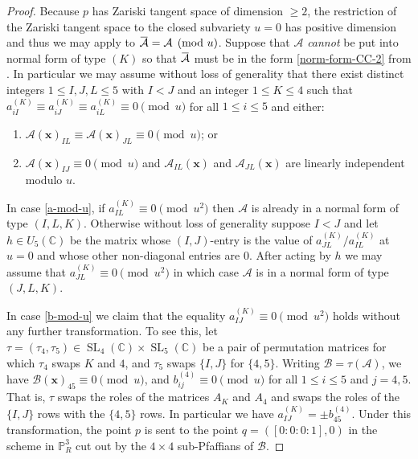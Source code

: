 \documentclass[10pt,a4paper]{amsart}
\DeclareMathOperator{\SL}{SL}
\newcommand{\CC}{\mathbb{C}}
\newcommand{\I}{I}
\newcommand{\J}{J}
\newcommand{\K}{K}
\newcommand{\PP}{\mathbb{P}}
\newcommand{\cA}{\mathcal{A}}
\newcommand{\cB}{\mathcal{B}}
\newcommand{\overbar}[1]{\mkern 1.5mu\overline{\mkern-1.5mu#1\mkern-1.5mu}\mkern 1.5mu}
\renewcommand{\L}{L}
\begin{document}
\begin{proof}
Because $p$ has Zariski tangent space of dimension $\geq 2$, the restriction of the Zariski tangent space to the closed subvariety $u = 0$ has positive dimension and thus we may apply  to $\overbar{\cA} = \cA \pmod{u}$. Suppose that $\cA$ \emph{cannot} be put into normal form of type $(\K)$ so that $\overbar{\cA}$ must be in the form \ref{norm-form-CC-2} from . In particular we may assume without loss of generality that there exist distinct integers $1 \leq \I,\J, \L \leq 5$ with $\I < \J$ and an integer $1 \leq \K \leq 4$ such that $a_{i \I}^{(\K)} \equiv a_{i \J}^{(\K)} \equiv a_{i \L}^{(\K)} \equiv 0 \pmod u$ for all $1 \leq i \leq 5$ and either:
\begin{enumerate}[label=(\roman*)]
    \item \label{a-mod-u} $\cA(\mathbf{x})_{\I\L} \equiv \cA(\mathbf{x})_{\J\L} \equiv 0 \pmod{u}$; or
    \item \label{b-mod-u} $\cA(\mathbf{x})_{\I\J}  \equiv 0 \pmod{u}$ and $\cA_{I\L}(\mathbf{x})$ and $\cA_{J\L}(\mathbf{x})$ are linearly independent modulo $u$.
\end{enumerate}

In case \ref{a-mod-u}, if $a_{\I\L}^{(\K)} \equiv 0 \pmod{u^2}$ then $\cA$ is already in a normal form of type $(\I, \L, \K)$. Otherwise without loss of generality suppose $\I < \J$ and let $h \in U_5(\CC)$ be the matrix whose $(\I,\J)$-entry is the value of $a_{\J\L}^{(\K)} / a_{\I\L}^{(\K)}$ at $u = 0$ and whose other non-diagonal entries are $0$. After acting by $h$ we may assume that $a_{\J\L}^{(\K)} \equiv 0 \pmod{u^2}$ in which case $\cA$ is in a normal form of type $(\J, \L, \K)$.

In case \ref{b-mod-u} we claim that the equality $a_{\I\J}^{(\K)} \equiv 0 \pmod{u^2}$ holds without any further transformation. To see this, let $\tau = (\tau_4, \tau_5) \in \SL_4(\CC) \times \SL_5(\CC)$ be a pair of permutation matrices for which $\tau_4$ swaps $\K$ and $4$, and $\tau_5$ swaps $\{\I,\J\}$ for $\{4,5\}$. Writing $\mathcal{B} = \tau(\cA)$, we have $\cB(\mathbf{x})_{45} \equiv 0 \pmod u$, and $b_{ij}^{(4)} \equiv 0 \pmod u$ for all $1 \leq i \leq 5$ and $j = 4,5$. That is, $\tau$ swaps the roles of the matrices $A_\K$ and $A_4$ and swaps the roles of the $\{\I,\J\}$ rows with the $\{4,5\}$ rows. In particular we have $a_{\I\J}^{(\K)} = \pm b_{45}^{(4)}$. Under this transformation, the point $p$ is sent to the point ${q} = ([0:0:0:1],0)$ in the scheme in $\PP^3_R$ cut out by the $4 \times 4$ sub-Pfaffians of $\cB$. 


\end{proof}
\end{document}
